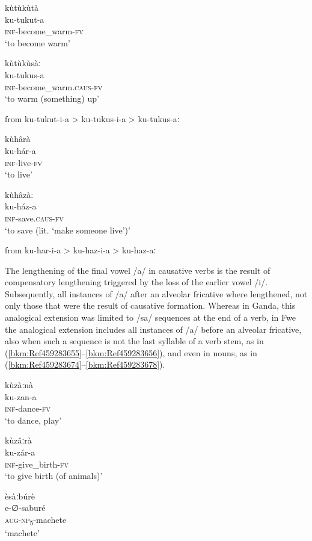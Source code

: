 \ea
\label{bkm:Ref98514649}
\ea
\glll kùtùkùtà\\
ku-tukut-a\\
\textsc{inf}-become\_warm-\textsc{fv}\\
\glt ‘to become warm’

\ex
\glll kùtùkùsàː\\
ku-tukus-a\\
\textsc{inf}-become\_warm.\textsc{caus}-\textsc{fv}\\
\glt ‘to warm (something) up’

\ex
  from ku-tukut-i-a > ku-tukus-i-a > ku-tukus-aː
\z\z

\ea
\label{bkm:Ref98514652}
\ea
\glll kùhârà\\
ku-hár-a\\
\textsc{inf}-live-\textsc{fv}\\
\glt ‘to live’

\ex
\glll kùhâzàː\\
ku-ház-a\\
\textsc{inf}-save.\textsc{caus}-\textsc{fv}\\
\glt ‘to save (lit. ‘make someone live’)’

\ex
  from ku-har-i-a > ku-haz-i-a > ku-haz-aː
\z\z

The lengthening of the final vowel /a/ in causative verbs is the result of compensatory length\-ening triggered by the loss of the earlier vowel /i/. Subsequently, all instances of /a/ after an alveolar fricative where lengthened, not only those that were the result of causative formation. Whereas in Ganda, this analogical extension was limited to /sa/ sequences at the end of a verb, in Fwe the analogical extension includes all instances of /a/ before an alveolar fricative, also when such a sequence is not the last syllable of a verb stem, as in (\ref{bkm:Ref459283655}--\ref{bkm:Ref459283656}), and even in nouns, as in (\ref{bkm:Ref459283674}--\ref{bkm:Ref459283678}).

\ea
\label{bkm:Ref459283655}
\glll kùzàːnà\\
ku-zan-a\\
\textsc{inf}-dance-\textsc{fv}\\
\glt ‘to dance, play’
\z

\ea
\label{bkm:Ref459283656}
\glll kùzâːrà\\
ku-zár-a\\
\textsc{inf}-give\_birth-\textsc{fv}\\
\glt ‘to give birth (of animals)’
\z

\ea
\label{bkm:Ref459283674}
\glll èsàːbúrè\\
e-∅-saburé\\
\textsc{aug}-\textsc{np}\textsubscript{5}-machete\\
\glt ‘machete’
\z

